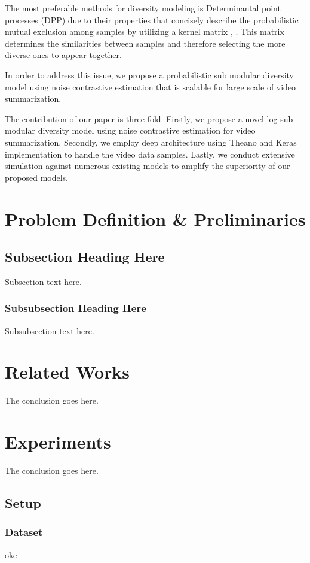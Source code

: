 \documentclass[conference]{IEEEtran}
\begin{document}
The most preferable methods for diversity modeling is Determinantal point processes (DPP) due to their properties that concisely describe the probabilistic mutual exclusion among samples by utilizing a kernel matrix \cite{kulesza2012}, \cite{vsumm}. This matrix determines the similarities between samples and therefore selecting the more diverse ones to appear together.

In order to address this issue, we propose a probabilistic sub modular diversity model using noise contrastive estimation that is scalable for large scale of video summarization.  

The contribution of our paper is three fold. Firstly, we propose a novel log-sub modular diversity model using noise contrastive estimation for video summarization. Secondly, we employ deep architecture using Theano and Keras \cite{keras} implementation to handle the video data samples. Lastly, we conduct extensive simulation against numerous existing models to amplify the superiority of our proposed models. 

\section{Problem Definition \& Preliminaries}

\subsection{Subsection Heading Here}
Subsection text here.


\subsubsection{Subsubsection Heading Here}
Subsubsection text here.


\section{Related Works}
The conclusion goes here.

\section{Experiments}
The conclusion goes here.

\subsection{Setup}

\subsubsection{Dataset}
oke
\end{document}
